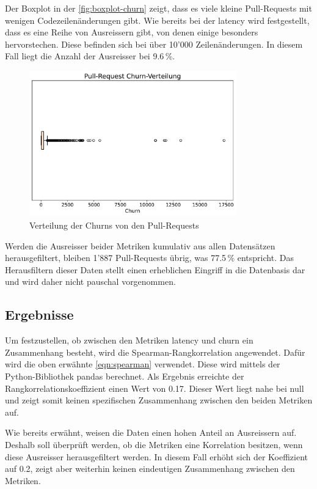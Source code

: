 Der Boxplot in der \autoref{fig:boxplot-churn} zeigt, dass es viele kleine Pull-Requests mit wenigen Codezeilenänderungen gibt. Wie bereits bei der latency wird festgestellt, dass es eine Reihe von Ausreissern gibt, von denen einige besonders hervorstechen. Diese befinden sich bei über 10'000 Zeilenänderungen. In diesem Fall liegt die Anzahl der Ausreisser bei 9.6\,\%.

\begin{figure}[htbp]
    \includegraphics[width=0.8\textwidth]{Figures/boxplot-churn.pdf}
      \centering
    \caption{Verteilung der Churns von den Pull-Requests}
    \label{fig:boxplot-churn}
\end{figure}

Werden die Ausreisser beider Metriken kumulativ aus allen Datensätzen herausgefiltert, bleiben 1'887 Pull-Requests übrig, was 77.5\,\% entspricht. Das Herausfiltern dieser Daten stellt einen erheblichen Eingriff in die Datenbasis dar und wird daher nicht pauschal vorgenommen.

\subsection{Ergebnisse}
Um festzustellen, ob zwischen den Metriken latency und churn ein Zusammenhang besteht, wird die Spearman-Rangkorrelation angewendet. Dafür wird die oben erwähnte \autoref{eqn:spearman} verwendet. Diese wird mittels der Python-Bibliothek pandas berechnet. Als Ergebnis erreichte der Rangkorrelationskoeffizient einen Wert von 0.17. Dieser Wert liegt nahe bei null und zeigt somit keinen spezifischen Zusammenhang zwischen den beiden Metriken auf. 

Wie bereits erwähnt, weisen die Daten einen hohen Anteil an Ausreissern auf. Deshalb soll überprüft werden, ob die Metriken eine Korrelation besitzen, wenn diese Ausreisser herausgefiltert werden. In diesem Fall erhöht sich der Koeffizient auf 0.2, zeigt aber weiterhin keinen eindeutigen Zusammenhang zwischen den Metriken.


